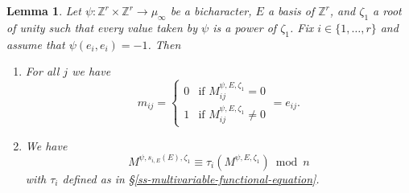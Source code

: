 \documentclass[11pt,letterpaper]{article}
\newtheorem{lemma}[theorem]{Lemma}
\theoremstyle{definition}
\theoremstyle{remark}
\numberwithin{equation}{section}
\theoremstyle{dotless}
\newcommand{\hchi}{\psi} %
\newcommand{\gene}{\zeta_1} %
\begin{document}
\begin{lemma}\label{dirichlet-bicharacter-identity} Let $\psi\colon \mathbb Z^r \times \mathbb Z^r \to \mu_\infty$ be a bicharacter, $E$ a basis of $\mathbb Z^r$, and $\gene$ a root of unity such that every value taken by $\psi$ is a power of $\gene$. Fix $i \in \{1,\dots, r\}$ and assume that $\psi(e_i,e_i)=-1$. Then

\begin{enumerate}
    \item  For all $j$ we have
    \begin{equation*} m_{ij} = \begin{cases} 0 & \textrm{if }M_{ij}^{\hchi,E,\gene} =0 \\ 1 & \textrm{if }M_{ij}^{\hchi,E,\gene} \neq 0 \end{cases} =e_{ij}.\end{equation*}

    \item We have
    \[  M^{\hchi,s_{i,E}(E) , \gene} \equiv \tau_i ( M^{\hchi,E, \gene}) \bmod n \]
with $\tau_i$ defined as in \S\ref{ss-multivariable-functional-equation}.
    
    
\end{enumerate}\end{lemma}
\end{document}
